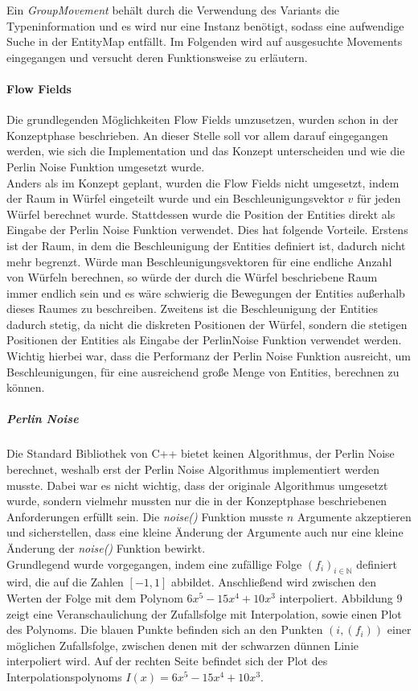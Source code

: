 \documentclass[11pt,a4paper]{article}
\begin{document}
Ein \textit{GroupMovement} behält durch die Verwendung des Variants die Typeninformation und es wird nur eine Instanz benötigt, sodass eine aufwendige Suche in der EntityMap entfällt. Im Folgenden wird auf ausgesuchte Movements eingegangen und versucht deren Funktionsweise zu erläutern.

\paragraph{Flow Fields} %
Die grundlegenden Möglichkeiten Flow Fields umzusetzen, wurden schon in der Konzeptphase beschrieben. An dieser Stelle soll vor allem darauf eingegangen werden, wie sich die Implementation und das Konzept unterscheiden und wie die Perlin Noise Funktion umgesetzt wurde.\\
Anders als im Konzept geplant, wurden die Flow Fields nicht umgesetzt, indem der Raum in Würfel eingeteilt wurde und ein Beschleunigungsvektor $v$ für jeden Würfel berechnet wurde. Stattdessen wurde die Position der Entities direkt als Eingabe der Perlin Noise Funktion verwendet. Dies hat folgende Vorteile. Erstens ist der Raum, in dem die Beschleunigung der Entities definiert ist, dadurch nicht mehr begrenzt. Würde man Beschleunigungsvektoren für eine endliche Anzahl von Würfeln berechnen, so würde der durch die Würfel beschriebene Raum immer endlich sein und es wäre schwierig die Bewegungen der Entities außerhalb dieses Raumes zu beschreiben. Zweitens ist die Beschleunigung der Entities dadurch stetig, da nicht die diskreten Positionen der Würfel, sondern die stetigen Positionen der Entities als Eingabe der PerlinNoise Funktion verwendet werden. Wichtig hierbei war, dass die Performanz der Perlin Noise Funktion ausreicht, um Beschleunigungen, für eine ausreichend große Menge von Entities, berechnen zu können.
\subparagraph{Perlin Noise}
Die Standard Bibliothek von C++ bietet keinen Algorithmus, der Perlin Noise berechnet, weshalb erst der Perlin Noise Algorithmus implementiert werden musste. Dabei war es nicht wichtig, dass der originale Algorithmus umgesetzt wurde, sondern vielmehr mussten nur die in der Konzeptphase beschriebenen Anforderungen erfüllt sein. Die \textit{noise()} Funktion musste $n$ Argumente akzeptieren und sicherstellen, dass eine kleine Änderung der Argumente auch nur eine kleine Änderung der \textit{noise()} Funktion bewirkt.\\
Grundlegend wurde vorgegangen, indem eine zufällige Folge $\left(f_i\right)_{i \in \mathbb{N}}$ definiert wird, die auf die Zahlen $[-1, 1]$ abbildet.
Anschließend wird zwischen den Werten der Folge mit dem Polynom $6x^5-15x^4+10x^3$ interpoliert. Abbildung 9 zeigt eine Veranschaulichung der Zufallsfolge mit Interpolation, sowie einen Plot des Polynoms. Die blauen Punkte befinden sich an den Punkten $\left(i, \left(f_i\right)\right)$ einer möglichen Zufallsfolge, zwischen denen mit der schwarzen dünnen Linie interpoliert wird. Auf der rechten Seite befindet sich der Plot des Interpolationspolynoms $I(x) = 6x^5-15x^4+10x^3$.
\end{document}
